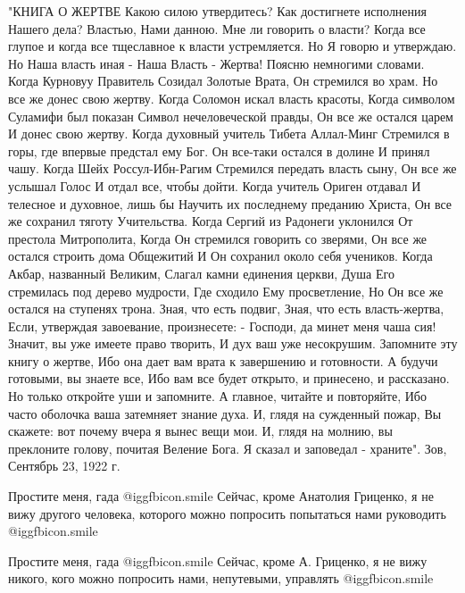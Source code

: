 \begin{itemize}
\obeycr
"КНИГА О ЖЕРТВЕ
Какою силою утвердитесь?
Как достигнете исполнения Нашего дела?
Властью, Нами данною.
Мне ли говорить о власти?
Когда все глупое и когда все тщеславное к власти устремляется.
Но Я говорю и утверждаю.
Но Наша власть иная -
Наша Власть - Жертва!
Поясню немногими словами.
Когда Курновуу Правитель
Созидал Золотые Врата,
Он стремился во храм.
Но все же донес свою жертву.
Когда Соломон искал власть красоты,
Когда символом Суламифи был показан
Символ нечеловеческой правды,
Он все же остался царем
И донес свою жертву.
Когда духовный учитель Тибета Аллал-Минг
Стремился в горы, где впервые предстал ему Бог.
Он все-таки остался в долине
И принял чашу.
Когда Шейх Россул-Ибн-Рагим
Стремился передать власть сыну,
Он все же услышал Голос
И отдал все, чтобы дойти.
Когда учитель Ориген отдавал
И телесное и духовное, лишь бы
Научить их последнему преданию Христа,
Он все же сохранил тяготу Учительства.
Когда Сергий из Радонеги уклонился
От престола Митрополита,
Когда Он стремился говорить со зверями,
Он все же остался строить дома Общежитий
И Он сохранил около себя учеников.
Когда Акбар, названный Великим,
Слагал камни единения церкви,
Душа Его стремилась под дерево мудрости,
Где сходило Ему просветление,
Но Он все же остался на ступенях трона.
Зная, что есть подвиг,
Зная, что есть власть-жертва,
Если, утверждая завоевание, произнесете:
- Господи, да минет меня чаша сия!
Значит, вы уже имеете право творить,
И дух ваш уже несокрушим.
Запомните эту книгу о жертве,
Ибо она дает вам врата к завершению и готовности.
А будучи готовыми, вы знаете все,
Ибо вам все будет открыто, и принесено, и рассказано.
Но только откройте уши и запомните.
А главное, читайте и повторяйте,
Ибо часто оболочка ваша затемняет знание духа.
И, глядя на сужденный пожар,
Вы скажете: вот почему вчера я вынес вещи мои.
И, глядя на молнию, вы преклоните голову, почитая Веление Бога.
Я сказал и заповедал - храните".
Зов, Сентябрь 23, 1922 г.
\restorecr


Простите меня, гада  @igg{fbicon.smile}  Сейчас, кроме Анатолия Гриценко, я не вижу другого
человека, которого можно попросить попытаться нами руководить  @igg{fbicon.smile} 


Простите меня, гада  @igg{fbicon.smile}  Сейчас, кроме А. Гриценко, я не вижу
никого, кого можно попросить нами, непутевыми, управлять  @igg{fbicon.smile} 



\end{itemize}
